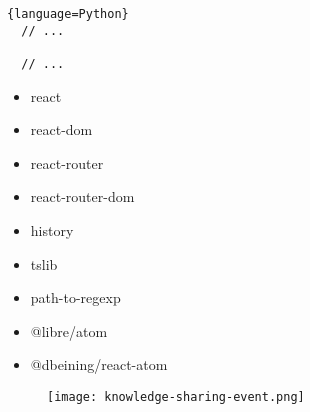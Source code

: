 \begin{lstlisting}{language=Python}
  // ...
  
  // ...
\end{lstlisting}

\begin{itemize}
    \item react
    \item react-dom
    \item react-router
    \item react-router-dom
    \item history
    \item tslib
    \item path-to-regexp
    \item @libre/atom
    \item @dbeining/react-atom
    
\end{itemize}

\begin{figure}[h!]
  \centering
  \captionsetup{justification=centering}
  \texttt{[image: knowledge-sharing-event.png]}
  \label{fig:1}
\end{figure}

